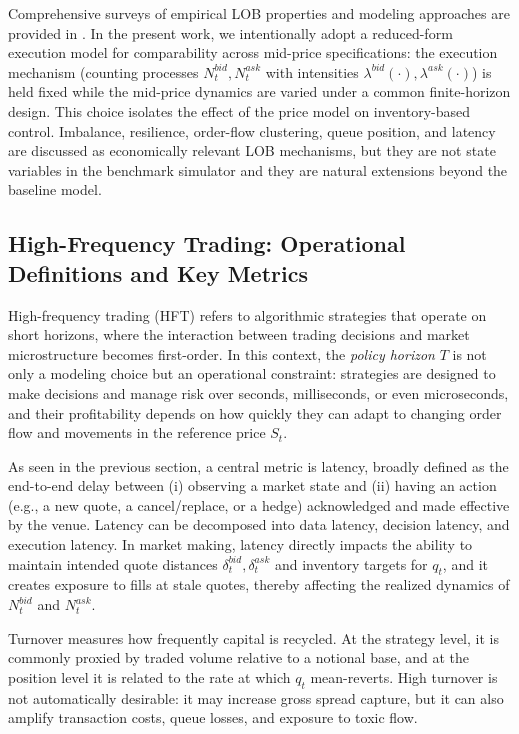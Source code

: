 Comprehensive surveys of empirical LOB properties and modeling approaches are provided in \textcite{GouldEtAl2013}. In the present work, we intentionally adopt a reduced-form execution model for comparability across mid-price specifications: the execution mechanism (counting processes $N_t^{bid},N_t^{ask}$ with intensities $\lambda^{bid}(\cdot),\lambda^{ask}(\cdot)$) is held fixed while the mid-price dynamics are varied under a common finite-horizon design. This choice isolates the effect of the price model on inventory-based control. Imbalance, resilience, order-flow clustering, queue position, and latency are discussed as economically relevant LOB mechanisms, but they are not state variables in the benchmark simulator and they are natural extensions beyond the baseline model.

\subsection{High-Frequency Trading: Operational Definitions and Key Metrics}
High-frequency trading (HFT) refers to algorithmic strategies that operate on short horizons, where the interaction between trading decisions and market microstructure becomes first-order. In this context, the \emph{policy horizon} $T$ is not only a modeling choice but an operational constraint: strategies are designed to make decisions and manage risk over seconds, milliseconds, or even microseconds, and their profitability depends on how quickly they can adapt to changing order flow and movements in the reference price $S_t$.

As seen in the previous section, a central metric is latency, broadly defined as the end-to-end delay between (i) observing a market state and (ii) having an action (e.g., a new quote, a cancel/replace, or a hedge) acknowledged and made effective by the venue. Latency can be decomposed into data latency, decision latency, and execution latency. In market making, latency directly impacts the ability to maintain intended quote distances $\delta_t^{bid},\delta_t^{ask}$ and inventory targets for $q_t$, and it creates exposure to fills at stale quotes, thereby affecting the realized dynamics of $N_t^{bid}$ and $N_t^{ask}$.

Turnover measures how frequently capital is recycled. At the strategy level, it is commonly proxied by traded volume relative to a notional base, and at the position level it is related to the rate at which $q_t$ mean-reverts. High turnover is not automatically desirable: it may increase gross spread capture, but it can also amplify transaction costs, queue losses, and exposure to toxic flow.

